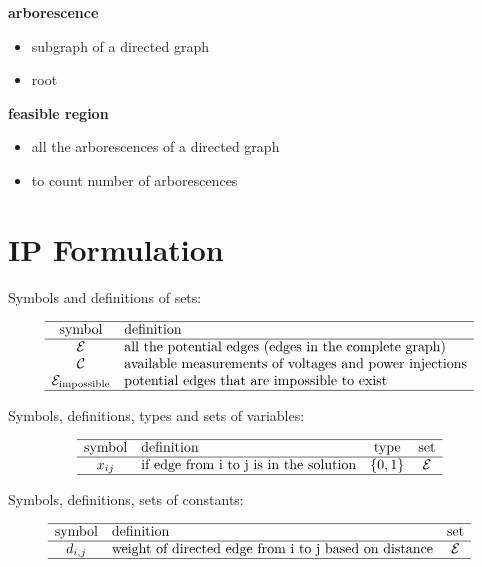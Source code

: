 \documentclass[
]{book}
\providecommand{\tightlist}{%
  \setlength{\itemsep}{0pt}\setlength{\parskip}{0pt}}
\begin{document}
\textbf{arborescence}

\begin{itemize}
\tightlist
\item
  subgraph of a directed graph
\item
  root
\end{itemize}

\textbf{feasible region}

\begin{itemize}
\tightlist
\item
  all the arborescences of a directed graph
\item
  to count number of arborescences
\end{itemize}

\hypertarget{ip-formulation}{%
\chapter{IP Formulation}\label{ip-formulation}}

Symbols and definitions of sets:

\[
\begin{array}{cl}
    \hline
    \text{symbol} & \text{definition} \\
    \hline
    \mathcal{E}
    & \text{all the potential edges (edges in the complete graph)} \\
    \mathcal{C}
    & \text{available measurements of voltages and power injections} \\
    \mathcal{E}_\text{impossible}
    & \text{potential edges that are impossible to exist} \\
    \hline
\end{array}
\]

Symbols, definitions, types and sets of variables:

\[
\begin{array}{clcc}
  \hline
  \text{symbol} & \text{definition}
  & \text{type} & \text{set} \\
  \hline
  x_{i j} & \text{if edge from i to j is in the solution}
  & \{0, 1\} & \mathcal{E} \\
  \hline
\end{array}
\]

Symbols, definitions, sets of constants:

\[
\begin{array}{clc}
  \hline
  \text{symbol} & \text{definition}
  & \text{set} \\
  \hline
  d_{i, j} & \text{weight of directed edge from i to j based on distance}
  & \mathcal{E} \\
  \hline
\end{array}
\]
\end{document}
